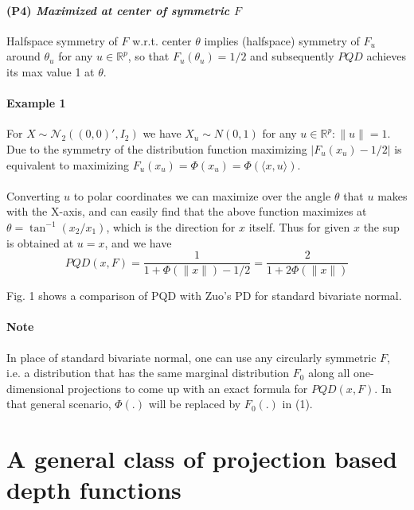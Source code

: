 \documentclass{article}
\begin{document}
\paragraph{(P4) \textit{Maximized at center of symmetric $F$}} Halfspace symmetry of $F$ w.r.t. center $\theta$ implies (halfspace) symmetry of $F_u$ around $\theta_u$ for any $u\in\mathbb{R}^p$, so that $F_u(\theta_u)=1/2$ and subsequently $PQD$ achieves its max value 1 at $\theta$.

\paragraph{Example 1}For $X\sim \mathcal{N}_2((0,0)',I_2)$ we have $X_u\sim N(0,1)$ for any $u\in\mathbb{R}^p: \|u\|=1$. Due to the symmetry of the distribution function maximizing $|F_u(x_u)-1/2|$ is equivalent to maximizing $F_u(x_u)=\Phi(x_u) = \Phi(\langle x,u\rangle)$.

\paragraph{} Converting $u$ to polar coordinates we can maximize over the angle $\theta$ that $u$ makes with the X-axis, and can easily find that the above function maximizes at $\theta = \tan^{-1}(x_2/x_1)$, which is the direction for $x$ itself. Thus for given $x$ the sup is obtained at $u=x$, and we have
\begin{equation}
PQD(x,F) = \frac{1}{1+\Phi(\|x\|)-1/2} = \frac{2}{1+2\Phi(\|x\|)}
\end{equation}

Fig. 1 shows a comparison of PQD with Zuo's PD for standard bivariate normal.
\paragraph{Note} In place of standard bivariate normal, one can use any circularly symmetric $F$, i.e. a distribution that has the same marginal distribution $F_0$ along all one-dimensional projections to come up with an exact formula for $PQD(x,F)$. In that general scenario, $\Phi(.)$ will be replaced by $F_0(.)$ in (1).

\section*{A general class of projection based depth functions}
\end{document}
